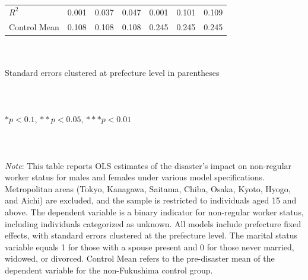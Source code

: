 \documentclass[serif, aspectratio=169]{beamer}
\newcommand{\nonregularlinks}{%
    \vfill %
    \hfill %
    {\small %
        \hyperlink{nonregular_placebo}{\beamerbutton{Placebo test}} \,
    }
}
\begin{document}
\begin{frame}[label=nonregular_status]
\begin{table}[htbp]
\begin{tabular}{@{}l*{6}{c}@{}}
$\textit{R}^2$&    0.001         &    0.037         &    0.047         &    0.001         &    0.101         &    0.109         \\
Control Mean&    0.108         &    0.108         &    0.108         &    0.245         &    0.245         &    0.245         \\
\bottomrule
\end{tabular}
\\\\{\linewidth}{\tiny Standard errors clustered at prefecture level in parentheses}\\\\
\\\\{\linewidth}{\tiny $*p<0.1$, $**p<0.05$, $***p<0.01$}\\\\
\\\\{\linewidth}{\tiny \textit{Note}: This table reports OLS estimates of the disaster's impact on non-regular worker status for males and females under various model specifications. Metropolitan areas (Tokyo, Kanagawa, Saitama, Chiba, Osaka, Kyoto, Hyogo, and Aichi) are excluded, and the sample is restricted to individuals aged 15 and above. The dependent variable is a binary indicator for non-regular worker status, including individuals categorized as unknown. All models include prefecture fixed effects, with standard errors clustered at the prefecture level. The marital status variable equals 1 for those with a spouse present and 0 for those never married, widowed, or divorced. Control Mean refers to the pre-disaster mean of the dependent variable for the non-Fukushima control group.}
\end{table}

\vspace{-2.2cm}
\nonregularlinks


\end{frame}
\end{document}
